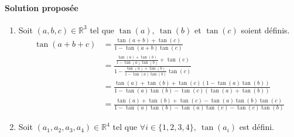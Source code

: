 \documentclass[14pt]{article}
\def\R{\mathbb R}
\def\lb{\lbrace}
\def\rb{\rbrace}
\begin{document}
    \paragraph{Solution proposée} 
    \begin{enumerate}
        \item Soit $(a,b,c)\in\R^3$ tel que $\tan(a),\ \tan(b)$ et $\tan(c)$ soient définis.\\

        \begin{align*}
            \tan(a+b+c) &=\frac{\tan(a+b)+\tan(c)}{1-\tan(a+b)\tan(c)}\\
                        &=\frac{\frac{\tan(a)+\tan(b)}{1-\tan(a)\tan(b)}+\tan(c)}{1-\frac{\tan(a)+\tan(b)}{1-\tan(a)\tan(b)}\tan(c)}\\
                        &=\frac{\tan(a)+\tan(b)+\tan(c)(1-\tan(a)\tan(b))}{1-\tan(a)\tan(b)-\tan(c)(\tan(a)+\tan(b))}\\
                        &=\frac{\tan(a)+\tan(b)+\tan(c)-\tan(a)\tan(b)\tan(c)}{1-\tan(a)\tan(b)-\tan(a)\tan(c)-\tan(c)\tan(b)}
        \end{align*}

        \item Soit $(a_1,a_2,a_3,a_4)\in\R^4$ tel que $\forall i\in\lb1,2,3,4\rb,\ \tan(a_i)$ est défini.\\


\end{enumerate}
\end{document}
